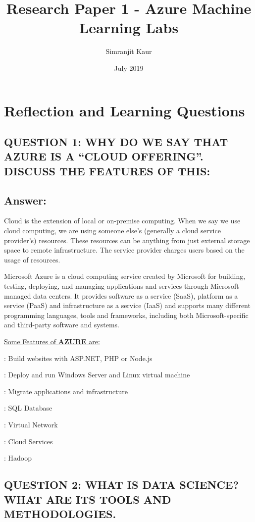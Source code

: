 \documentclass[10 pm]{article}
\title  {Research Paper 1 - Azure Machine Learning Labs }
\author{Simranjit Kaur  }
\date{July 2019}
\begin{document}
\maketitle


\section{Reflection and Learning Questions}

\subsection{QUESTION 1: WHY DO WE SAY THAT AZURE IS A “CLOUD OFFERING”. DISCUSS THE FEATURES OF THIS:}

\subsection*{Answer:}
Cloud is the extension of local or on-premise computing. When we say we use cloud computing, we are using someone else’s (generally a cloud service provider’s) resources. These resources can be anything from just external storage space to remote infrastructure. The service provider charges users based on the usage of resources. 

Microsoft Azure is a cloud computing service created by Microsoft for building, testing, deploying, and managing applications and services through Microsoft-managed data centers. It provides software as a service (SaaS), platform as a service (PaaS) and infrastructure as a service (IaaS) and supports many different programming languages, tools and frameworks, including both Microsoft-specific and third-party software and systems. 

\underline{Some Features of \textbf{AZURE} are:} 

 : Build websites with ASP.NET, PHP or Node.js

 : Deploy and run Windows Server and Linux virtual machine

 : Migrate applications and infrastructure

 : SQL Database	

 : Virtual Network

 : Cloud Services

 : Hadoop


\subsection{QUESTION 2: WHAT IS DATA SCIENCE? WHAT ARE ITS TOOLS AND METHODOLOGIES.}
\end{document}
